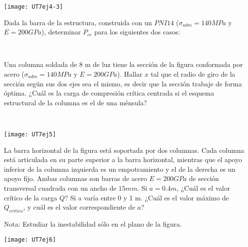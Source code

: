 \ejercicio 

\begin{center}
\texttt{[image: UT7ej4-3]}
\end{center}

Dada la barra de la estructura, construida con un $PNI14$ ($\sigma_{adm}=140MPa$ y $E=200GPa$), determinar $P_{cr}$ para los siguientes dos casos:

\begin{figure}[htb]
	\centering
\subfloat[Caso 1]{
\texttt{[image: UT7ej4-1]}
	\label{fig:UT74.1}}
~
\subfloat[Caso 2]{
\texttt{[image: UT7ej4-2]}
	\label{fig:UT74.2}}
\caption{}
	\label{fig:UT74}
\end{figure}

\ejercicio

\begin{minipage}[b]{0.7\textwidth}

Una columna soldada de 8 m de luz tiene la sección de la figura conformada por acero ($\sigma_{adm}=140MPa$ y $E=200GPa$). 
\parte Hallar $x$ tal que el radio de giro de la sección según sus dos ejes sea el mismo, es decir que la sección trabaje de forma óptima.
\parte ¿Cuál es la carga de compresión crítica centrada si el esquema estructural de la columna es el de una ménsula?

\end{minipage}
~
\begin{minipage}[b]{0.3\textwidth}
\begin{center}
\texttt{[image: UT7ej5]}
\end{center}
\end{minipage}

\ejercicio

La barra horizontal de la figura está soportada por dos columnas. Cada columna está articulada en su parte superior a la barra horizontal, mientras que el apoyo inferior de la columna izquierda es un empotramiento y el de la derecha es un apoyo fijo. Ambas columnas son barras de acero $E=200GPa$ de sección transversal cuadrada con un ancho de $15 mm$.
\parte Si $a=0.4m$, ¿Cuál es el valor crítico de la carga $Q$?
\parte Si a varía entre 0 y 1 m. ¿Cuál es el valor máximo de $Q_{critico}$, y cuál es el valor correspondiente de $a$?

Nota: Estudiar la inestabilidad sólo en el plano de la figura.

\begin{center}
\texttt{[image: UT7ej6]}
\end{center}

